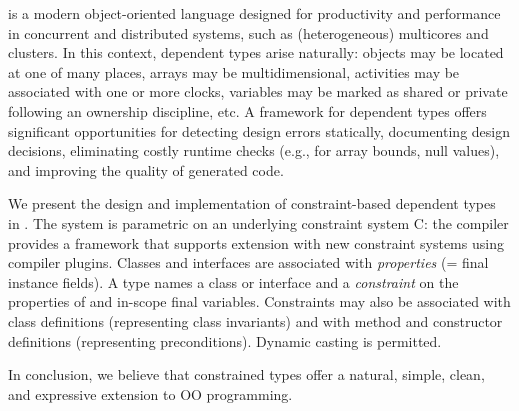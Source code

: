\Xten{} is a modern object-oriented language designed for productivity
and performance in concurrent and distributed systems, such as
(heterogeneous) multicores and clusters. In this context, dependent
types arise naturally: objects may be located at one of many places,
arrays may be multidimensional, activities may be associated with one
or more clocks, variables may be marked as shared or private following
an ownership discipline, etc.  A framework for dependent types offers
significant opportunities for detecting design errors statically,
documenting design decisions, eliminating costly runtime checks
(e.g., for array bounds, null values), and improving the quality of
generated code.

We present the design and implementation of constraint-based
dependent types in \Xten{}.
The system is parametric on an underlying constraint
system {\cal C}: the compiler provides a framework that supports extension
with new constraint systems using compiler 
plugins.
Classes and interfaces are associated with {\em
properties} (= final instance fields). A type  names a class
or interface  and a {\em constraint}  on the
properties of  and in-scope final variables.  Constraints
may also be associated with class definitions (representing
class invariants) and with method and constructor definitions
(representing preconditions). Dynamic casting is permitted.

In conclusion, we believe that constrained types offer a natural,
simple, clean, and expressive extension to OO programming.
